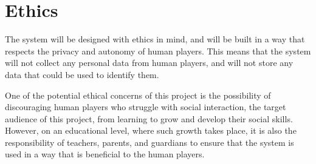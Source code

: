 \section{Ethics}\label{sec:methodology-ethics}
The system will be designed with ethics in mind, and will be built in a way
that respects the privacy and autonomy of human players. This means that the
system will not collect any personal data from human players, and will not
store any data that could be used to identify them.

One of the potential ethical concerns of this project is the possibility of
discouraging human players who struggle with social interaction, the target
audience of this project, from learning to grow and develop their social skills.
However, on an educational level, where such growth takes place, it is
also the responsibility of teachers, parents, and guardians to ensure that the
system is used in a way that is beneficial to the human players.
